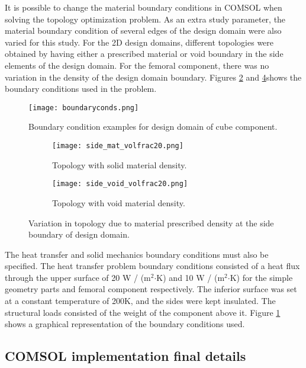 \documentclass[../main.tex]{subfiles}
\begin{document}
It is possible to change the material boundary conditions in COMSOL when solving the topology optimization problem. As an extra study parameter, the material boundary condition of several edges of the design domain were also varied for this study. For the 2D design domains, different topologies were obtained by having either a prescribed material or void boundary in the side elements of the design domain. For the femoral component, there was no variation in the density of the design domain boundary. Figures \ref{fig:solid} and \ref{fig:void}shows the boundary conditions used in the problem. 

\begin{figure}[h!]
  \centering
  \texttt{[image: boundaryconds.png]}
  \caption{Boundary condition examples for design domain of cube component.} 
  \label{fig:boundary}
\end{figure}


\begin{figure}
  \begin{subfigure}{0.45\textwidth}
    \texttt{[image: side\_mat\_volfrac20.png]}
    \caption{Topology with solid material density.}
    \label{fig:solid}
  \end{subfigure}
  \begin{subfigure}{0.45\textwidth}
    \texttt{[image: side\_void\_volfrac20.png]}
    \caption{Topology with void material density.}
    \label{fig:void}
  \end{subfigure}
  \caption{Variation in topology due to material prescribed density at the side boundary of design domain.}
\end{figure}

The heat transfer and solid mechanics boundary conditions must also be specified. The heat transfer problem boundary conditions consisted of a heat flux through the upper surface of 20 W / (m$^2$$\cdot$K) and 10 W / (m$^2$$\cdot$K) for the simple geometry parts and femoral component respectively. The inferior surface was set at a constant temperature of 200\degree K, and the sides were kept insulated. The structural loads consisted of the weight of the component above it. Figure  \ref{fig:boundary} shows a graphical representation of the boundary conditions used.

\subsection{COMSOL implementation final details}
\end{document}
